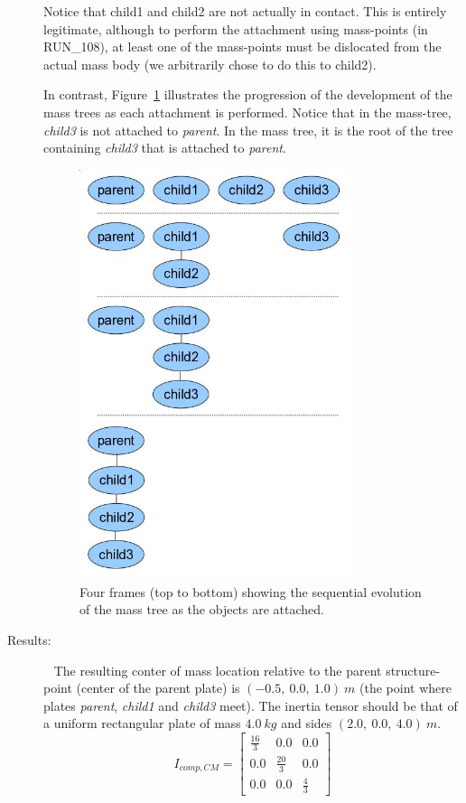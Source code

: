 \begin{description}
Notice that child1 and child2 are not actually in contact.  This is entirely 
legitimate, although to perform the attachment using mass-points (in 
RUN\_108), at least one of the mass-points must be dislocated from the actual 
mass body (we arbitrarily chose to do this to child2).

In contrast, Figure~\ref{fig:four_plates_tree} illustrates the progression of 
the development of the mass trees as each attachment is performed.  Notice 
that in the mass-tree, \textit{child3} is not attached to \textit{parent}.  
In the mass tree, it is the root of the tree containing 
\textit{child3} that is attached to \textit{parent}.

\begin{figure}[h]
\begin{center}
\includegraphics[height=120mm]{pics/four_plates_tree.jpg}
\caption[Mass Tree Evolution]
{Four frames (top to bottom) showing the sequential evolution of the 
mass tree as the objects are attached.}
\label{fig:four_plates_tree}
\end{center}
\end{figure}

\item[Results:]\ \newline
The resulting conter of mass location relative to the parent structure-point 
(center of the parent plate) is $(-0.5,~0.0,~1.0)~m$ (the point where plates 
\textit{parent}, \textit{child1} and \textit{child3} meet).
The inertia tensor should be that of a uniform rectangular plate of mass 
$4.0~kg$ and sides $(2.0,~0.0,~4.0)~m$.
\begin{equation*}
I_{comp,CM} = 
   \begin{bmatrix} \frac{16}{3} & 0.0   & 0.0  \\
                   0.0   & \frac{20}{3} & 0.0   \\
                    0.0  & 0.0   & \frac{4}{3} 
   \end{bmatrix}
\end{equation*} 


\end{description}
